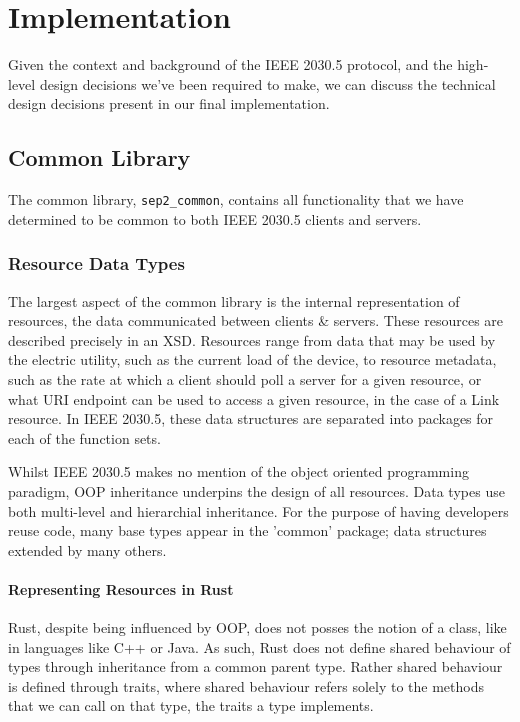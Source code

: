 \chapter{Implementation}\label{ch:implementation}
Given the context and background of the IEEE 2030.5 protocol, and the high-level design decisions we've been required to make, we can discuss the technical design decisions present in our final implementation.

\section{Common Library}
The common library, \texttt{sep2\_common}, contains all functionality that we have determined to be common to both IEEE 2030.5 clients and servers.

\subsection{Resource Data Types}
The largest aspect of the common library is the internal representation of resources, the data communicated between clients \& servers. These resources are described precisely in an XSD.
Resources range from data that may be used by the electric utility, such as the current load of the device, to resource metadata, such as the rate at which a client should poll a server for a given resource, or what URI endpoint can be used to access a given resource, in the case of a Link resource.
In IEEE 2030.5, these data structures are separated into packages for each of the function sets.

Whilst IEEE 2030.5 makes no mention of the object oriented programming paradigm, OOP inheritance underpins the design of all resources. Data types use both multi-level and hierarchial inheritance.
For the purpose of having developers reuse code, many base types appear in the 'common' package; data structures extended by many others.

\subsubsection{Representing Resources in Rust}
Rust, despite being influenced by OOP, does not posses the notion of a class, like in languages like C++ or Java. As such, Rust does not define shared behaviour of types through inheritance from a common parent type. 
Rather shared behaviour is defined through traits, where shared behaviour refers solely to the methods that we can call on that type, the traits a type implements.


